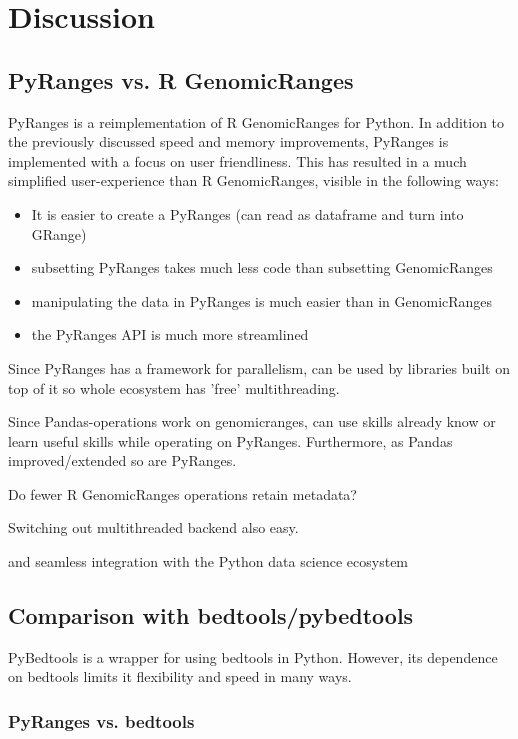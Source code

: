 \documentclass[10pt,letterpaper]{article}
\begin{document}
\section*{Discussion}

\subsection*{PyRanges vs. R GenomicRanges}

PyRanges is a reimplementation of R GenomicRanges for Python. In addition to the
previously discussed speed and memory improvements, PyRanges is implemented with
a focus on user friendliness. This has resulted in a much simplified
user-experience than R GenomicRanges, visible in the following ways:

\begin{itemize}
  \item It is easier to create a PyRanges (can read as dataframe and turn into GRange)
  \item subsetting PyRanges takes much less code than subsetting GenomicRanges
  \item manipulating the data in PyRanges is much easier than in GenomicRanges
  \item the PyRanges API is much more streamlined
\end{itemize}

Since PyRanges has a framework for parallelism, can be used by libraries built
on top of it so whole ecosystem has 'free' multithreading.

Since Pandas-operations work on genomicranges, can use skills already know or
learn useful skills while operating on PyRanges. Furthermore, as Pandas
improved/extended so are PyRanges.

Do fewer R GenomicRanges operations retain metadata?

Switching out multithreaded backend also easy.

and seamless integration with the Python data
science ecosystem

\subsection*{Comparison with bedtools/pybedtools}

PyBedtools is a wrapper for using bedtools in Python. However, its dependence on
bedtools limits it flexibility and speed in many ways.

\subsubsection*{PyRanges vs. bedtools}
\end{document}
